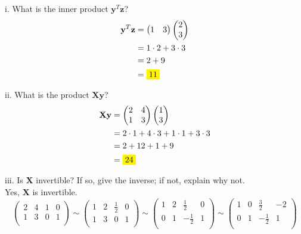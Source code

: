 \documentclass[12pt]{article}
\begin{document}
i. What is the inner product $\mathbf{y}^{T}\mathbf{z}$?
\begin{align*}
\mathbf{y}^{T}\mathbf{z} &= \begin{pmatrix}  1 & 3 \\ \end{pmatrix} \begin{pmatrix}  2 \\ 3 \\ \end{pmatrix} \\
&= 1 \cdot 2 + 3 \cdot 3\\
&= 2 + 9 \\
&= \colorbox{yellow}{11}
\end{align*}

ii. What is the product $\mathbf{Xy}$?
\begin{align*}
\mathbf{Xy} &= \begin{pmatrix}  2 & 4 \\ 1 & 3 \\ \end{pmatrix} \begin{pmatrix}  1 \\ 3 \end{pmatrix} \\
&= 2 \cdot 1 + 4 \cdot 3 + 1 \cdot 1 + 3 \cdot 3\\
&= 2 + 12 + 1 + 9 \\
&= \colorbox{yellow}{24}
\end{align*}

iii. Is $\mathbf{X}$ invertible? If so, give the inverse; if not, explain why not.\\

Yes, $\mathbf{X}$ is invertible.
$$\begin{pmatrix}  2 & 4 & 1 & 0\\ 1 & 3 & 0 & 1\\ \end{pmatrix} \sim \begin{pmatrix}  1 & 2 & \frac{1}{2} & 0\\ 1 & 3 & 0 & 1\\ \end{pmatrix} \sim \begin{pmatrix}  1 & 2 & \frac{1}{2} & 0\\ 0 & 1 & -\frac{1}{2} & 1\\ \end{pmatrix} \sim \begin{pmatrix}  1 & 0 & \frac{3}{2} & -2\\ 0 & 1 & -\frac{1}{2} & 1\\ \end{pmatrix}$$
\end{document}
